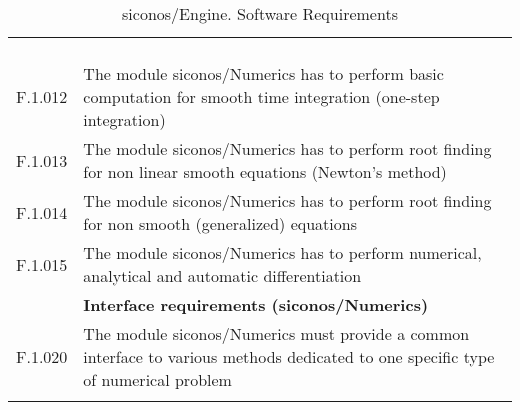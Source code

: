 \begin{longtable}{%
    |>{\columncolor[gray]{.8}}p{}%
    |>{\columncolor[gray]{.95}}p{}|}
\begin{enumerate}
  \end{enumerate}\\
  F.1.012 & The module \ac{siconos}/Numerics has to perform basic computation for smooth time integration (one-step integration)  \\
  F.1.013 & The module \ac{siconos}/Numerics has to perform root finding for non linear smooth equations (Newton's method)\\
  F.1.014 & The module \ac{siconos}/Numerics has to perform root finding for non smooth (generalized) equations  \\
  F.1.015 & The module \ac{siconos}/Numerics has to perform numerical, analytical and automatic differentiation\\
  \hline

  & \textbf{Interface  requirements (\ac{siconos}/Numerics)}\\
  \hline 
   F.1.020 & The module \ac{siconos}/Numerics must provide a common interface to various methods dedicated to one specific type of numerical problem\\
  \hline
  \caption{\ac{siconos}/Engine. Software Requirements}\\
\end{longtable}



